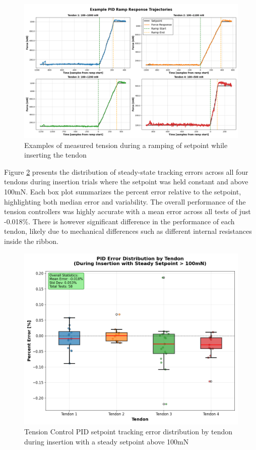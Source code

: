 \begin{figure} [H]
    \centering
    \includegraphics[width=\linewidth]{images/PID performance/rampExamples.png}
    \caption{Examples of measured tension during a ramping of setpoint while inserting the tendon}
    \label{fig:rampresponse}
\end{figure}

Figure \ref{fig:PIDErrorDistByTendon} presents the distribution of steady-state tracking errors across all four tendons during insertion trials where the setpoint was held constant and above 100mN. Each box plot summarizes the percent error relative to the setpoint, highlighting both median error and variability. The overall performance of the tension controllers was highly accurate with a mean error across all tests of just -0.018\%. There is however significant difference in the performance of each tendon, likely due to mechanical differences such as different internal resistances inside the ribbon.

\begin{figure} [H]
    \centering
    \includegraphics[width=0.9\linewidth]{images/PID performance/PIDErrorDistByTendon.png}
    \caption{Tension Control PID setpoint tracking error distribution by tendon during insertion with a steady setpoint above 100mN}
    \label{fig:PIDErrorDistByTendon}
\end{figure}

